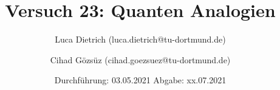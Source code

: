 

\subject{Fortgeschrittenenpraktikum der Fakultät Physik}
\title{Versuch 23: Quanten Analogien}
\author{Luca Dietrich (luca.dietrich@tu-dortmund.de) \and Cihad Gözsüz (cihad.goezsuez@tu-dortmund.de)}
\date{
  Durchführung: 03.05.2021
  \hspace{3em}
  Abgabe: xx.07.2021
}
\publishers{TU Dortmund – Fakultät Physik}



\maketitle
\thispagestyle{empty}
\tableofcontents
\newpage






\newpage
\printbibliography{}


